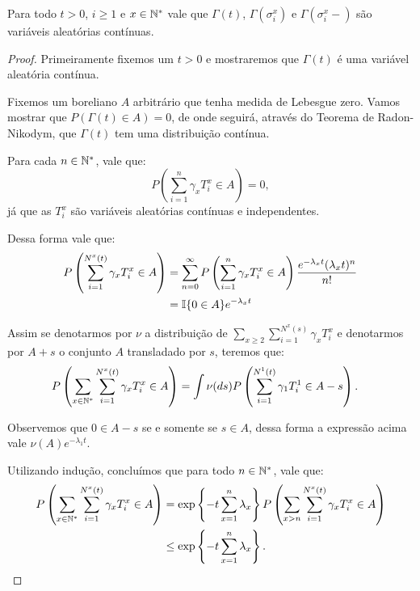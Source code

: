 \begin{proposicao}
  \label{prop:gamma-dist-continua}
  Para todo $t > 0$, $i \geq 1$ e $x \in {\mathbb{N^*}}$ vale que $\Gamma(t)$,
  $\Gamma(\sigma^x_i)$ e $\Gamma(\sigma^x_i-)$ são variáveis
  aleatórias contínuas.
\end{proposicao}
\begin{proof}

  Primeiramente fixemos um $t > 0$ e mostraremos que $\Gamma(t)$ é uma
  variável aleatória contínua.

  Fixemos um boreliano $A$ arbitrário que tenha medida de Lebesgue
  zero. Vamos mostrar que $P(\Gamma(t) \in A) = 0$, de onde seguirá,
  através do Teorema de Radon-Nikodym, que $\Gamma(t)$ tem uma
  distribuição contínua.


  Para cada $n \in {\mathbb{N^*}}$, vale que:
  \begin{displaymath}
    P\left(\sum_{i = 1}^n \gamma_x T_i^x \in A \right) = 0,
  \end{displaymath}
  já que as $T_i^x$ são variáveis aleatórias contínuas e
  independentes.

  Dessa forma vale que:
  \begin{align*}
    P\left(\sum_{i = 1}^{N^x(t)} \gamma_x T_i^x \in A \right) 
    &= \sum_{n = 0}^{\infty}
    P\left(\sum_{i = 1}^n \gamma_x T_i^x \in A \right)
    \frac{e^{-\lambda_x t} (\lambda_x t)^n}{n!}\\
    &= {\mathbb{I}}\{ 0 \in A\} e^{-\lambda_x t} 
  \end{align*}

  Assim se denotarmos por $\nu$ a distribuição de $\sum_{x \geq 2}
  \sum_{i = 1}^{N^x(s)} \gamma_x T_i^x$ e denotarmos por $A+s$ o
  conjunto $A$ transladado por $s$, teremos que:
  \begin{align*}
    P\left(\sum_{x \in {\mathbb{N^*}}}\sum_{i = 1}^{N^x(t)} \gamma_x T_i^x \in A  \right) 
    &= \int \nu(d s) P\left(\sum_{i = 1}^{N^1(t)} \gamma_1 T_i^1 \in A - s\right).
  \end{align*}

  Observemos que $0 \in A - s$ se e somente se $s \in A$, dessa forma
  a expressão acima vale $\nu(A) e^{-\lambda_1 t}$.

  Utilizando indução, concluímos que para todo $n \in {\mathbb{N^*}}$, vale que:
  \begin{align*}
    P\left(\sum_{x \in {\mathbb{N^*}}}\sum_{i = 1}^{N^x(t)} \gamma_x T_i^x \in A \right) 
    &= \exp\left\{ -t \sum_{x = 1}^n \lambda_x \right\}
    P\left(\sum_{x > n} \sum_{i = 1}^{N^x(t)} \gamma_x T_i^x \in A \right) \\
    &\leq \exp\left\{ -t \sum_{x = 1}^n \lambda_x \right\}.
  \end{align*}


\end{proof}
